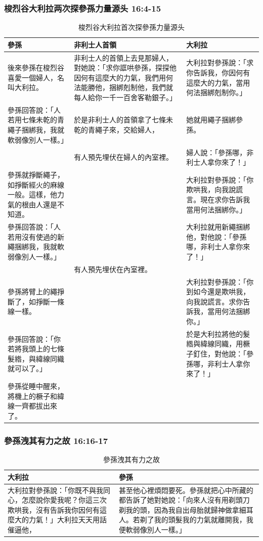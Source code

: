 \subsubsection{梭烈谷大利拉两次探參孫力量源头 16:4-15}
\begin{table}[H]
\centering
\begin{tabular}{p{6cm}|p{}|p{}}\hline
參孫&非利士人首領&大利拉\\\hline
後來參孫在梭烈谷喜愛一個婦人，名叫大利拉。&非利士人的首領上去見那婦人，對她說：「求你誆哄參孫，探探他因何有這麼大的力氣，我們用何法能勝他，捆綁剋制他，我們就每人給你一千一百舍客勒銀子。」&大利拉對參孫說：「求你告訴我，你因何有這麼大的力氣，當用何法捆綁剋制你。」\\\hline
參孫回答說：「人若用七條未乾的青繩子捆綁我，我就軟弱像別人一樣。」&於是非利士人的首領拿了七條未乾的青繩子來，交給婦人，&她就用繩子捆綁參孫。\\\hline
&有人預先埋伏在婦人的內室裡。&婦人說：「參孫哪，非利士人拿你來了！」\\\hline
參孫就掙斷繩子，如掙斷經火的麻線一般。這樣，他力氣的根由人還是不知道。&&大利拉對參孫說：「你欺哄我，向我說謊言。現在求你告訴我當用何法捆綁你。」\\\hline
參孫回答說：「人若用沒有使過的新繩捆綁我，我就軟弱像別人一樣。」&&大利拉就用新繩捆綁他，對他說：「參孫哪，非利士人拿你來了！」\\\hline
&有人預先埋伏在內室裡。&\\\hline
參孫將臂上的繩掙斷了，如掙斷一條線一樣。&&大利拉對參孫說：「你到如今還是欺哄我，向我說謊言。求你告訴我，當用何法捆綁你。」\\\hline
參孫回答說：「你若將我頭上的七條髮綹，與緯線同織就可以了。」&&於是大利拉將他的髮綹與緯線同織，用橛子釘住，對他說：「參孫哪，非利士人拿你來了！」\\\hline
參孫從睡中醒來，將機上的橛子和緯線一齊都拔出來了。&&\\\hline
\end{tabular}
\caption{梭烈谷大利拉首次探參孫力量源头}
\end{table}  





\subsubsection{參孫洩其有力之故 16:16-17}
\begin{table}[H]
\centering
\begin{tabular}{p{7cm}|p{10.1cm}}\hline
大利拉&參孫\\\hline
大利拉對參孫說：「你既不與我同心，怎麼說你愛我呢？你這三次欺哄我，沒有告訴我你因何有這麼大的力氣！」大利拉天天用話催逼他，&甚至他心裡煩悶要死。參孫就把心中所藏的都告訴了她對她說：「向來人沒有用剃頭刀剃我的頭，因為我自出母胎就歸神做拿細耳人。若剃了我的頭髮我的力氣就離開我，我便軟弱像別人一樣。」\\\hline
 \end{tabular}
\caption{參孫洩其有力之故}
\end{table}  


